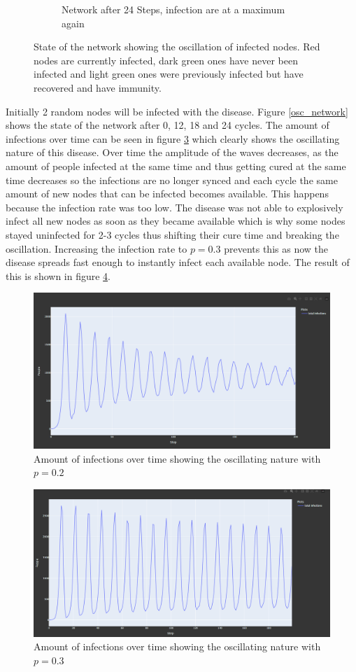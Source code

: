 \begin{figure}
\begin{subfigure}[b]{0.475\textwidth}
        \caption[]%
        {{\small Network after 24 Steps, infection are at a maximum again}}    
        \label{fig:mean and std of net44}
    \end{subfigure}
    \caption[ State of the network showing the oscillation of infected nodes ]
    {\small State of the network showing the oscillation of infected nodes. Red nodes are currently infected, dark green ones have never been infected and 
    light green ones were previously infected but have recovered and have immunity.} 
    \label{fig:osc_network}
\end{figure}

Initially 2 random nodes will be infected with the disease. Figure \ref{osc_network}
shows the state of the network after 0, 12, 18 and 24 cycles.
The amount of infections over time can be seen in figure \ref{fig:oscillation_p02}
which clearly shows the oscillating nature of this disease. Over time the amplitude of the
waves decreases, as the amount of people infected at the same time and thus getting cured
at the same time decreases so the infections are no longer synced and each cycle the same
amount of new nodes that can be infected becomes available. This happens because the
infection rate was too low. The disease was not able to explosively infect all new nodes
as soon as they became available which is why some nodes stayed uninfected for 2-3 cycles
thus shifting their cure time and breaking the oscillation. Increasing the infection rate
to $p = 0.3$ prevents this as now the disease spreads fast enough to instantly infect each
available node. The result of this is shown in figure \ref{fig:oscillation_p03}.

\begin{figure}
    \centering
    \includegraphics[width=0.5\linewidth]{images/oscillation_infections.png}
    \caption{Amount of infections over time showing the oscillating nature with $p = 0.2$}
    \label{fig:oscillation_p02}
\end{figure}

\begin{figure}
    \centering
    \includegraphics[width=0.5\linewidth]{images/oscillation_infections3.png}
    \caption{Amount of infections over time showing the oscillating nature with $p = 0.3$}
    \label{fig:oscillation_p03}
\end{figure}

